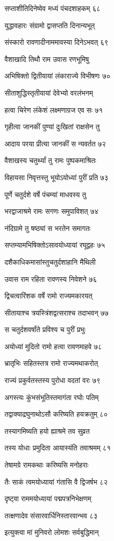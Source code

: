 सप्ताशीतिदिनेष्वेव मध्यं पंचदशाहकम् ६८

युद्धावहारः संग्रामो द्वासप्तति दिनान्यभूत्

संस्कारो रावणादीनाममावस्या दिनेऽभवत् ६९

वैशाखादि तिथौ राम उवास रणभूमिषु

अभिषिक्तो द्वितीयायां लंकाराज्ये विभीषणः ७०

सीताशुद्धिस्तृतीयायां देवेभ्यो वरलंभनम्

हत्वा चिरेण लंकेशं लक्ष्मणाग्रज एव सः ७१

गृहीत्वा जानकीं पुण्यां दुःखितां राक्षसेन तु

आदाय परया प्रीत्या जानकीं स न्यवर्तत ७२

वैशाखस्य चतुर्थ्यां तु रामः पुष्पकमाश्रितः

विहायसा निवृत्तस्तु भूयोऽयोध्यां पुरीं प्रति ७३

पूर्णे चतुर्दशे वर्षे पंचम्यां माधवस्य तु

भरद्वाजाश्रमे रामः सगणः समुपाविशत् ७४

नंदिग्रामे तु षष्ठ्यां स भरतेन समागतः

सप्तम्यामभिषिक्तोऽसावयोध्यायां रघूद्वहः ७५

दशैकाधिकमासांस्तुचतुर्दशाहानि मैथिली

उवास राम रहिता रावणस्य निवेशने ७६

द्विचत्वारिंशक वर्षे रामो राज्यमकारयत्

सीतायाश्च त्रयस्त्रिंशद्वत्सराश्च तदाभवन् ७७

स चतुर्दशवर्षांते प्रविश्य च पुरीं प्रभुः

अयोध्यां मुदितो रामो हत्वा रावणमाहवे ७८

भ्रातृभिः सहितस्तत्र रामो राज्यमथाकरोत्

राज्यं प्रकुर्वतस्तस्य पुरोधा वदतां वरः ७९

अगस्त्यः कुंभसंभूतिस्तमागंता रघोः पतिम्

तद्वाक्याद्रघुनाथोऽसौ करिष्यति हयक्रतुम् ८०

तस्यागमिष्यति हयो ह्याश्रमे तव सुव्रत

तस्य योधाः प्रमुदिता आयास्यंति तवाश्रमम् ८१

तेषामग्रे रामकथाः करिष्यसि मनोहराः

तैः साकं त्वमयोध्यायां गंतासि वै द्विजर्षभ ८२

दृष्ट्वा राममयोध्यायां पद्मपत्रनिभेक्षणम्

तत्क्षणादेव संसारवार्धिनिस्तारवान्भव ८३

इत्युक्त्वा मां मुनिवरो लोमशः सर्वबुद्धिमान्

